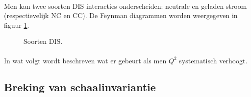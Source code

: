 \documentclass[a4paper,11pt]{article}
\numberwithin{equation}{section} %
\begin{document}
      \paragraph{}
Men kan twee soorten DIS interacties onderscheiden: neutrale en geladen stroom (respectievelijk NC en CC). De Feynman diagrammen worden weergegeven in figuur \ref{fig:NC-CC}.
\begin{figure} [H]
  \centering
  \caption{Soorten DIS. \cite{Martin}}
  \label{fig:NC-CC}
\end{figure}

      \paragraph{}
In wat volgt wordt beschreven wat er gebeurt als men $Q^2$ systematisch verhoogt.

  \subsection{Breking van schaalinvariantie}
\end{document}
